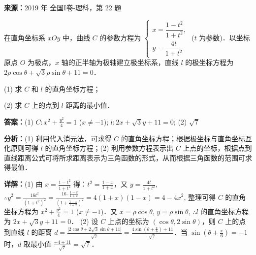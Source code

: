 \begin{question}[points=10]
\textbf{来源：}2019 年 全国I卷-理科，第 22 题\par
[选修 4—4：坐标系与参数方程]

在直角坐标系 $xOy$ 中，曲线 $C$ 的参数方程为 $\begin{cases} x = \dfrac{1 - t^2}{1 + t^2}, \\ y = \dfrac{4t}{1 + t^2} \end{cases}$ ($t$ 为参数)．以坐标原点 $O$ 为极点，$x$ 轴的正半轴为极轴建立极坐标系，直线 $l$ 的极坐标方程为 $2\rho\cos\theta + \sqrt{3}\rho\sin\theta + 11 = 0$．

(1) 求 $C$ 和 $l$ 的直角坐标方程；

(2) 求 $C$ 上的点到 $l$ 距离的最小值．
\begin{solution}
\textbf{答案：}(1) $C: x^2 + \frac{y^2}{4} = 1$ ($x \neq -1$); $l: 2x + \sqrt{3}y + 11 = 0$; (2) $\sqrt{7}$

\textbf{分析：}(1) 利用代入消元法，可求得 $C$ 的直角坐标方程；根据极坐标与直角坐标互化原则可得 $l$ 的直角坐标方程；(2) 利用参数方程表示出 $C$ 上点的坐标，根据点到直线距离公式可将所求距离表示为三角函数的形式，从而根据三角函数的范围可求得最值．

\textbf{详解：}(1) 由 $x = \frac{1 - t^2}{1 + t^2}$ 得：$t^2 = \frac{1 - x}{1 + x}$，又 $y = \frac{4t}{1 + t^2}$, $\therefore y^2 = \frac{16t^2}{(1 + t^2)^2} = \frac{16 \cdot \frac{1-x}{1+x}}{\left(1 + \frac{1-x}{1+x}\right)^2} = 4(1+x)(1-x) = 4 - 4x^2$, 整理可得 $C$ 的直角坐标方程为 $x^2 + \frac{y^2}{4} = 1$ ($x \neq -1$)．又 $x = \rho\cos\theta$, $y = \rho\sin\theta$, $\therefore l$ 的直角坐标方程为 $2x + \sqrt{3}y + 11 = 0$．
(2) 设 $C$ 上点的坐标为 $(\cos\theta, 2\sin\theta)$，则 $C$ 上的点到直线 $l$ 的距离 $d = \frac{|2\cos\theta + 2\sqrt{3}\sin\theta + 11|}{\sqrt{7}} = \frac{4\sin\left(\theta + \frac{\pi}{6}\right) + 11}{\sqrt{7}}$．当 $\sin\left(\theta + \frac{\pi}{6}\right) = -1$ 时，$d$ 取最小值 $\frac{-4 + 11}{\sqrt{7}} = \sqrt{7}$．
\end{solution}
\end{question}

